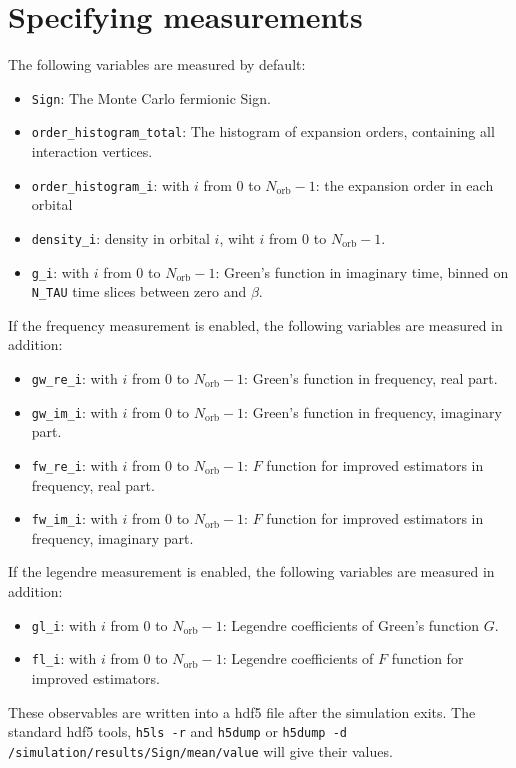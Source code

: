 \documentclass[aps,prb,floatfix,superscriptaddress,twocolumn,notitlepage]{revtex4-1}
\begin{document}
\section{Specifying measurements}
The following variables are measured by default:
\begin{itemize}
\item \verb#Sign#: The Monte Carlo fermionic Sign.
\item \verb#order_histogram_total#: The histogram of expansion orders, containing all interaction vertices.
\item \verb#order_histogram_i#: with $i$ from $0$ to $N_{\text{orb}}-1$: the expansion order in each orbital
\item \verb#density_i#: density in orbital $i$, wiht $i$ from $0$ to $N_{\text{orb}}-1$.

\item \verb#g_i#: with $i$ from $0$ to $N_{\text{orb}}-1$: Green's function in imaginary time, binned on \verb#N_TAU# time slices between zero and $\beta$.
\end{itemize}
If the frequency measurement is enabled, the following variables are measured in addition:
\begin{itemize}
\item \verb#gw_re_i#: with $i$ from $0$ to $N_{\text{orb}}-1$: Green's function in frequency, real part.
\item \verb#gw_im_i#: with $i$ from $0$ to $N_{\text{orb}}-1$: Green's function in frequency, imaginary part.
\item \verb#fw_re_i#: with $i$ from $0$ to $N_{\text{orb}}-1$: $F$ function for improved estimators in frequency, real part.
\item \verb#fw_im_i#: with $i$ from $0$ to $N_{\text{orb}}-1$: $F$ function for improved estimators in frequency, imaginary part.
\end{itemize}
If the legendre measurement is enabled, the following variables are measured in addition:
\begin{itemize}
\item \verb#gl_i#: with $i$ from $0$ to $N_{\text{orb}}-1$: Legendre coefficients of Green's function $G$.
\item \verb#fl_i#: with $i$ from $0$ to $N_{\text{orb}}-1$: Legendre coefficients of $F$ function for improved estimators.
\end{itemize}
These observables are written into a hdf5 file after the simulation exits. The standard hdf5 tools, \verb#h5ls -r# and \verb#h5dump# or \verb#h5dump -d /simulation/results/Sign/mean/value# will give their values.
\end{document}

